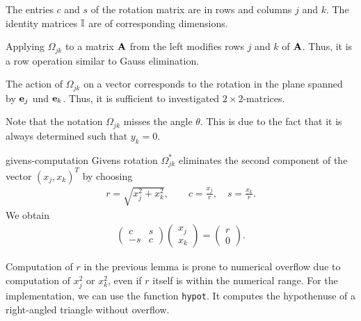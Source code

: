 \begin{remark}
  The entries $c$ and $s$ of the rotation matrix are in rows and
  columns $j$ and $k$.  The identity matrices $\mathbb I$ are of
  corresponding dimensions.

  Applying $\Omega_{jk}$ to a matrix $\mathbf A$ from the left modifies rows  $j$ and $k$ of $\mathbf A$. Thus, it is a row operation similar to Gauss elimination.

  The action of $\Omega_{jk}$ on a vector corresponds to the rotation
  in the plane spanned by $\mathbf e_j$ und $\mathbf e_k$. Thus, it is sufficient to investigated $2\times2$-matrices.

  Note that the notation $\Omega_{jk}$ misses the angle $\theta$. This
  is due to the fact that it is always determined such that $y_k=0$.
\end{remark}

\begin{Lemma}{givens-computation}
  Givens rotation $\Omega_{jk}^*$ eliminates the second component of the vector
  $(x_j,x_k)^T$ by choosing
  \begin{gather}
    r = \sqrt{x_j^2+x_k^2},\qquad
    c = \frac{x_j}r,\quad s = \frac{x_k}r.
  \end{gather}
  We obtain
  \begin{gather}
    \begin{pmatrix}
      c & s \\ -s & c
    \end{pmatrix}
    \begin{pmatrix}
      x_j\\x_k
    \end{pmatrix}
    =
    \begin{pmatrix}
      r\\0
    \end{pmatrix}
    .
  \end{gather}
\end{Lemma}

\begin{remark}
  Computation of $r$ in the previous lemma is prone to numerical
  overflow due to computation of $x_j^2$ or $x_k^2$, even if $r$
  itself is within the numerical range. For the implementation, we can
  use the function \lstinline!hypot!. It computes the hypothenuse of a
  right-angled triangle without overflow.
\end{remark}




